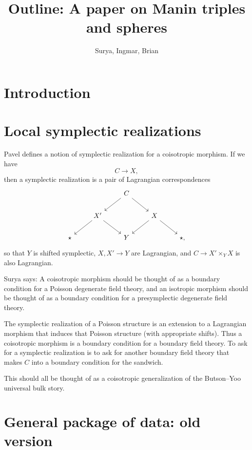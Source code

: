 \documentclass[12pt]{amsart}
\begin{document}

\title{Outline: A paper on Manin triples and spheres}
\author{Surya, Ingmar, Brian}

\maketitle

\section{Introduction}


\section{Local symplectic realizations}

Pavel defines a notion of symplectic realization for a coisotropic morphism. If we have 
\[
C \to X,
\]
then a symplectic realization is a pair of Lagrangian correspondences
\[
\begin{tikzcd}
& & C \ar[dl] \ar[dr] & & \\
& X' \ar[dl] \ar[dr]& & X \ar[dl] \ar[dr] & \\
\star & & Y & & \star,
\end{tikzcd}
\]
so that $Y$ is shifted symplectic,  $X, X' \to Y$ are Lagrangian, and $C \to X' \times_Y X$ is also Lagrangian.

Surya says: A coisotropic morphism should be thought of as a boundary condition for a Poisson degenerate field theory, and an isotropic morphism should be thought of as a boundary condition for a presymplectic degenerate field theory.

The symplectic realization of a Poisson structure is an extension to a Lagrangian morphism that induces that Poisson structure (with appropriate shifts). Thus a coisotropic morphism is a boundary condition for a boundary field theory. To ask for a symplectic realization is to ask for another boundary field theory that makes $C$ into a boundary condition for the sandwich.

This should all be thought of as a coisotropic generalization of the Butson--Yoo universal bulk story.
\section{General package of data: old version}
\end{document}

